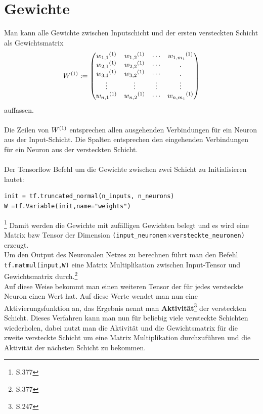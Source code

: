 \section{Gewichte}
Man kann alle Gewichte zwischen Inputschicht und der ersten versteckten Schicht als Gewichtsmatrix \begin{equation}
W\textsuperscript{(1)}:=
\begin{pmatrix}
w_{1,1}\textsuperscript{(1)} & w_{1,2}\textsuperscript{(1)} & \cdots & w_{1,m_1}\textsuperscript{(1)} \\
w_{2,1}\textsuperscript{(1)} & w_{2,2}\textsuperscript{(1)}& \cdots & .\\
w_{3,1}\textsuperscript{(1)} & w_{3,2}\textsuperscript{(1)}& \cdots & .\\
\vdots & \vdots & \vdots & \vdots \\
w_{n,1}\textsuperscript{(1)} & w_{n,2}\textsuperscript{(1)} & \cdots & w_{n,m_1}\textsuperscript{(1)}\\
\end{pmatrix} \end{equation}
auffassen.\\\\
Die Zeilen von $W\textsuperscript{(1)}$ entsprechen allen ausgehenden Verbindungen f\"ur ein Neuron aus der Input-Schicht. Die Spalten entsprechen den eingehenden Verbindungen f\"ur ein Neuron aus der versteckten Schicht. \\\\
Der Tensorflow Befehl um die Gewichte zwischen zwei Schicht zu Initialisieren lautet:\\
\begin{lstlisting}
init = tf.truncated_normal(n_inputs, n_neurons)
W =tf.Variable(init,name="weights")
\end{lstlisting}\footnote{\cite{handson} S.377}
Damit werden die Gewichte mit zuf\"alligen Gewichten belegt und es wird eine Matrix bzw Tensor der Dimension \lstinline$(input_neuronen$$ \times $\lstinline$versteckte_neuronen)$ erzeugt.\\
Um den Output des Neuronalen Netzes zu berechnen f\"uhrt man den Befehl \lstinline$tf.matmul(input,W)$ eine Matrix Multiplikation zwischen Input-Tensor und Gewichtsmatrix durch.\footnote{\cite{handson} S.377}\\
Auf diese Weise bekommt man einen weiteren Tensor der f\"ur jedes versteckte Neuron einen Wert hat. Auf diese Werte wendet man nun eine Aktivierungsfunktion an, das Ergebnis nennt man \textbf{Aktivit\"at}\footnote{\cite{Ertel2013} S.247} der versteckten Schicht. Dieses Verfahren kann man nun f\"ur beliebig viele versteckte Schichten wiederholen, dabei nutzt man die Aktivit\"at und die Gewichtsmatrix f\"ur die zweite versteckte Schicht um eine Matrix Multiplikation durchzuf\"uhren und die Aktivit\"at der n\"achsten Schicht zu bekommen.
